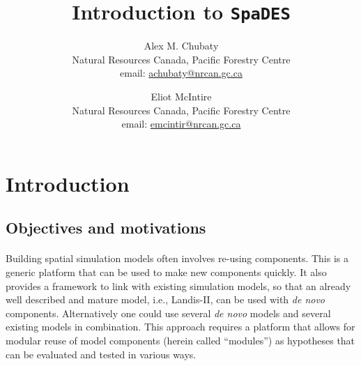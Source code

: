 \documentclass{article}
\title{Introduction to \texttt{SpaDES}}
\author{
  Alex M. Chubaty\\
	\small{Natural Resources Canada, Pacific Forestry Centre}\\
	\small{email: \href{mailto:achubaty@nrcan.gc.ca}{achubaty@nrcan.gc.ca}}
	\and
	Eliot McIntire\\
	\small{Natural Resources Canada, Pacific Forestry Centre}\\
	\small{email: \href{mailto:emcintir@nrcan.gc.ca}{emcintir@nrcan.gc.ca}}
}
\begin{document}


\maketitle


\tableofcontents

\newpage

\section{Introduction}

\subsection{Objectives and motivations}

\paragraph{}
Building spatial simulation models often involves re-using components. This is a generic platform that can be used to make new components quickly. It also provides a framework to link with existing simulation models, so that an already well described and mature model, i.e., Landis-II, can be used with \textit{de novo} components. Alternatively one could use several \textit{de novo} models and several existing models in combination. This approach requires a platform that allows for modular reuse of model components (herein called ``modules'') as hypotheses that can be evaluated and tested in various ways.
\end{document}
